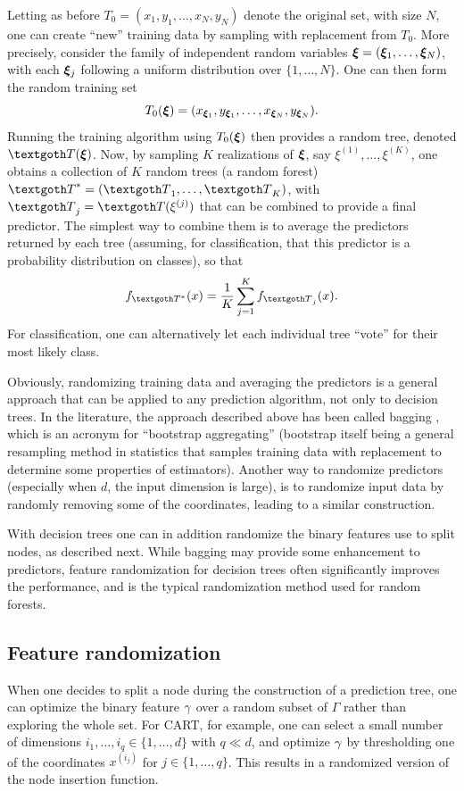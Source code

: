 Letting as before $T_0 = (x_1, y_1, \ldots, x_N, y_N)$ denote the original set, with size $N$, one can create ``new'' training data by sampling with replacement from $T_0$. More precisely, consider the family of independent random variables 
${\bm{\xi}} = ({\bm{\xi}}_1, \ldots, {\bm{\xi}}_N)$, with each ${\bm{\xi}}_j$ following a uniform distribution over $\{1, \ldots, N\}$. One can then form the random training set 
\[
T_0({\bm{\xi}})   = (x_{{\bm{\xi}}_1},y_{{\bm{\xi}}_1}, \ldots, x_{{\bm{\xi}}_N},y_{{\bm{\xi}}_N}).
\]
Running the training algorithm using $T_0({\bm{\xi}})$ then provides a random tree, denoted $\CTR(\bfxi)$. Now, by sampling $K$ realizations of ${\bm{\xi}}$, say $\xi^{(1)}, \ldots, \xi^{(K)}$, one obtains a collection of $K$ random trees (a random forest) $\CTR^* = (\CTR_1, \ldots, \CTR_K)$, with $\CTR_j = \CTR(\xi^{(j)})$ that can be combined to provide a final predictor. The simplest way to combine them is to average the predictors returned by each tree (assuming, for classification, that this predictor is a probability distribution on classes), so that
\begin{equation}
\label{eq:rf.mean}
f_{\CTR^*}(x) = \frac 1 K \sum_{j=1}^K f_{\CTR_j}(x).
\end{equation}
For classification, one can alternatively let each individual tree ``vote'' for their most likely class.

Obviously, randomizing training data and averaging the predictors is a general approach that can be applied to any prediction algorithm, not only to decision trees.  In the literature, the approach described above has been called  \alert{bagging} \citep{breiman1996bagging}, which is an acronym for ``bootstrap aggregating'' (bootstrap itself being a general resampling method in statistics that samples training data with replacement to determine some properties of  estimators). Another way to randomize predictors (especially when $d$, the input dimension is large), is to randomize input data by randomly removing some of the coordinates, leading to a similar construction. 

With decision trees one can in addition randomize the binary features use to split nodes, as described next. While bagging may provide some enhancement to predictors, feature randomization for decision trees often significantly improves the performance, and is the typical randomization method used for random forests.

\subsection{Feature randomization}
  When one decides to split a node during the construction of a prediction tree,  one can optimize the binary feature $\gamma$ over a random subset of $\Gamma$ rather than exploring the whole set. 
  For CART, for example, one can select a small number of dimensions $i_1, \ldots, i_q\in \{1, \ldots, d\}$ with $q\ll d$, and optimize $\gamma$ by thresholding one of the coordinates $x^{(i_j)}$ for $j\in \{1, \ldots, q\}$.
  This results in a randomized version of the node insertion function. 

